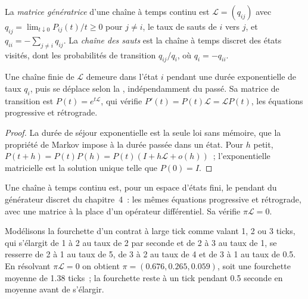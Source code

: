 \begin{definition}\label{def:qm:markov-chains-and-queues:generator}
La \emph{matrice génératrice} d'une chaîne à temps continu est $\mathcal L = (q_{ij})$ avec $q_{ij}
= \lim_{t\downarrow0}P_{ij}(t)/t \ge 0$ pour $j \ne i$, le taux de sauts de $i$ vers $j$, et $q_{ii} = -\sum_{j\ne i}q_{ij}$. La
\emph{chaîne des sauts} est la chaîne à temps discret des états visités, dont les probabilités de transition
$q_{ij}/q_i$, où $q_i = -q_{ii}$.
\end{definition}

\begin{proposition}\label{prop:qm:markov-chains-and-queues:kolmogorov}
Une chaîne finie de  $\mathcal L$ demeure dans l'état $i$ pendant une durée exponentielle de taux $q_i$, puis se déplace
selon la , indépendamment du passé. Sa matrice de transition est $P(t) = e^{t\mathcal L}$, qui
vérifie $P'(t) = P(t)\mathcal L = \mathcal LP(t)$, les équations progressive et rétrograde.
\end{proposition}

\begin{proof}
La durée de séjour exponentielle est la seule loi sans mémoire, que la propriété de Markov impose à la durée
passée dans un état. Pour $h$ petit, $P(t + h) = P(t)P(h) = P(t)(I + h\mathcal L + o(h))$~; l'exponentielle matricielle est la
solution unique telle que $P(0) = I$.
\end{proof}

Une chaîne à temps continu est, pour un espace d'états fini, le pendant du générateur discret du chapitre~4~: les
mêmes équations progressive et rétrograde, avec une matrice à la place d'un opérateur différentiel. Sa  vérifie $\pi\mathcal L = 0$.

\begin{example}\label{ex:qm:markov-chains-and-queues:spread}
Modélisons la fourchette d'un contrat à large tick comme valant 1, 2 ou 3 ticks, qui s'élargit de 1 à 2 au taux de 2 par seconde et de 2
à 3 au taux de 1, se resserre de 2 à 1 au taux de 5, de 3 à 2 au taux de 4 et de 3 à 1 au taux de 0.5. En résolvant $\pi\mathcal L
= 0$ on obtient $\pi = (0.676, 0.265, 0.059)$, soit une fourchette moyenne de 1.38 ticks~; la fourchette reste à un tick pendant 0.5 seconde
en moyenne avant de s'élargir.
\end{example}

